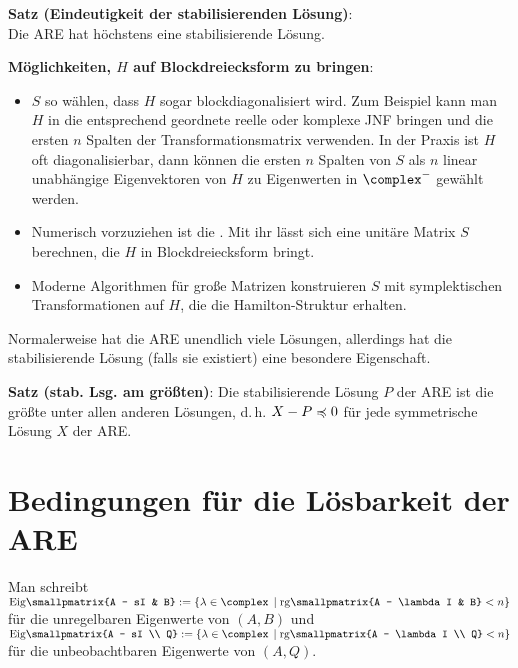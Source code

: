 \textbf{Satz (Eindeutigkeit der stabilisierenden Lösung)}:\\
Die ARE hat höchstens eine stabilisierende Lösung.

\linie

\textbf{Möglichkeiten, $H$ auf Blockdreiecksform zu bringen}:
\begin{itemize}
    \item
    $S$ so wählen, dass $H$ sogar blockdiagonalisiert wird.
    Zum Beispiel kann man $H$ in die entsprechend geordnete reelle oder komplexe JNF bringen
    und die ersten $n$ Spalten der Transformationsmatrix verwenden.
    In der Praxis ist $H$ oft diagonalisierbar,
    dann können die ersten $n$
    Spalten von $S$ als $n$ linear unabhängige Eigenvektoren von $H$
    zu Eigenwerten in $\complex^-$ gewählt werden.

    \item
    Numerisch vorzuziehen ist die .
    Mit ihr lässt sich eine unitäre Matrix $S$ berechnen, die $H$ in Blockdreiecksform bringt.

    \item
    Moderne Algorithmen für große Matrizen konstruieren $S$ mit symplektischen Transformationen
    auf $H$, die die Hamilton-Struktur erhalten.
\end{itemize}

\linie

Normalerweise hat die ARE unendlich viele Lösungen, allerdings hat die stabilisierende Lösung
(falls sie existiert) eine besondere Eigenschaft.

\textbf{Satz (stab. Lsg. am größten)}:
Die stabilisierende Lösung $P$ der ARE ist die größte unter allen anderen Lösungen,
d.\,h. $X - P \preccurlyeq 0$ für jede symmetrische Lösung $X$ der ARE.

\pagebreak

\section{%
    Bedingungen für die Lösbarkeit der ARE%
}

Man schreibt $\Eig\!\smallpmatrix{A - sI & B} := \{\lambda \in \complex \;\left|\;
\rg\!\smallpmatrix{A - \lambda I & B} < n\right\}$ für die
unregelbaren Eigenwerte von $(A, B)$ und
$\Eig\!\smallpmatrix{A - sI \\ Q} := \{\lambda \in \complex \;\left|\;
\rg\!\smallpmatrix{A - \lambda I \\ Q} < n\right\}$ für die
unbeobachtbaren Eigenwerte von $(A, Q)$.

